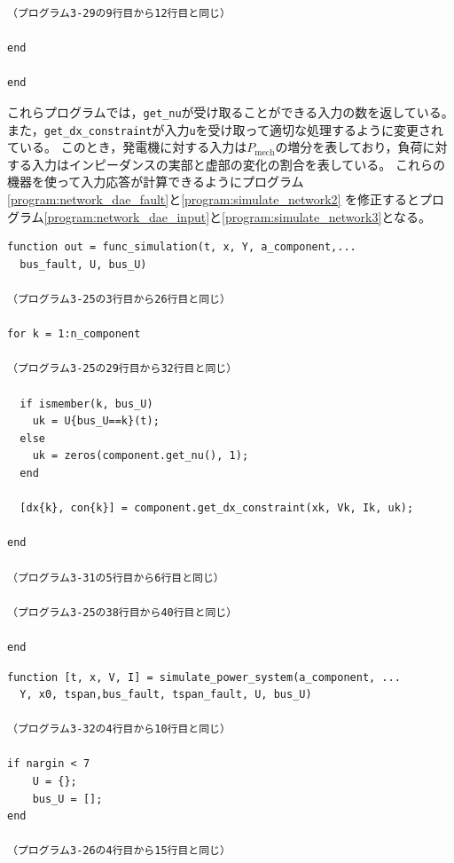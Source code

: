 \documentclass[tombow,dvipdfmx]{corona-a5-1.1}
\begin{document}
\begin{例}[入力信号に対する時間応答の数値計算]
\begin{PROGRAMA}[count,title={load\_impedance.m}]
\begin{verbatim}
（プログラム3-29の9行目から12行目と同じ）

end

end
\end{verbatim}
\end{PROGRAMA}

これらプログラムでは，\verb|get_nu|が受け取ることができる入力の数を返している。
また，\verb|get_dx_constraint|が入力\verb|u|を受け取って適切な処理するように変更されている。
このとき，発電機に対する入力は$P_\mathrm{mech}$の増分を表しており，負荷に対する入力はインピーダンスの実部と虚部の変化の割合を表している。
これらの機器を使って入力応答が計算できるようにプログラム\ref{program:network_dae_fault}と\ref{program:simulate_network2}
を修正するとプログラム\ref{program:network_dae_input}と\ref{program:simulate_network3}となる。

\smallskip
\begin{PROGRAMA}[count,title={func\_simulation.m}]\label{program:network_dae_input}
\begin{verbatim}
function out = func_simulation(t, x, Y, a_component,...
  bus_fault, U, bus_U)

（プログラム3-25の3行目から26行目と同じ）

for k = 1:n_component

（プログラム3-25の29行目から32行目と同じ）
  
  if ismember(k, bus_U)
    uk = U{bus_U==k}(t);
  else
    uk = zeros(component.get_nu(), 1);
  end
  
  [dx{k}, con{k}] = component.get_dx_constraint(xk, Vk, Ik, uk);
  
end

（プログラム3-31の5行目から6行目と同じ）

（プログラム3-25の38行目から40行目と同じ）

end
\end{verbatim}
\end{PROGRAMA}

\begin{PROGRAMA}[count,title={simulate\_power\_system.m}]\label{program:simulate_network3}
\begin{verbatim}
function [t, x, V, I] = simulate_power_system(a_component, ...
  Y, x0, tspan,bus_fault, tspan_fault, U, bus_U)

（プログラム3-32の4行目から10行目と同じ）

if nargin < 7
    U = {};
    bus_U = [];
end

（プログラム3-26の4行目から15行目と同じ）


\end{verbatim}
\end{PROGRAMA}
\end{例}
\end{document}

